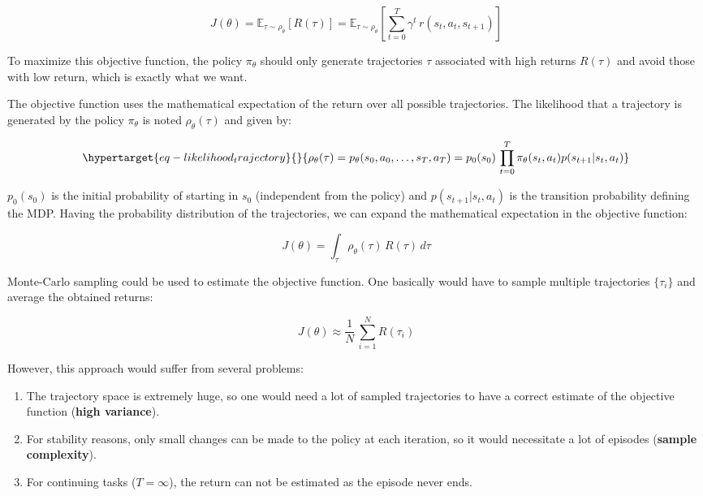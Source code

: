 \documentclass[
  letterpaper,
  DIV=11,
  numbers=noendperiod]{scrreprt}
\providecommand{\tightlist}{%
  \setlength{\itemsep}{0pt}\setlength{\parskip}{0pt}}\usepackage{longtable,booktabs,array}
\begin{document}
\[
    J(\theta) = \mathbb{E}_{\tau \sim \rho_\theta}[R(\tau)] = \mathbb{E}_{\tau \sim \rho_\theta}[\sum_{t=0}^T \gamma^t \, r(s_t, a_t, s_{t+1}) ]
\]

To maximize this objective function, the policy \(\pi_\theta\) should
only generate trajectories \(\tau\) associated with high returns
\(R(\tau)\) and avoid those with low return, which is exactly what we
want.

The objective function uses the mathematical expectation of the return
over all possible trajectories. The likelihood that a trajectory is
generated by the policy \(\pi_\theta\) is noted \(\rho_\theta(\tau)\)
and given by:

\begin{equation}\protect\hypertarget{eq-likelihood_trajectory}{}{
    \rho_\theta(\tau) = p_\theta(s_0, a_0, \ldots, s_T, a_T) = p_0 (s_0) \, \prod_{t=0}^T \pi_\theta(s_t, a_t) p(s_{t+1} | s_t, a_t)
}\label{eq-likelihood_trajectory}\end{equation}

\(p_0 (s_0)\) is the initial probability of starting in \(s_0\)
(independent from the policy) and \(p(s_{t+1} | s_t, a_t)\) is the
transition probability defining the MDP. Having the probability
distribution of the trajectories, we can expand the mathematical
expectation in the objective function:

\[
    J(\theta) = \int_\tau \rho_\theta (\tau) \, R(\tau) \, d\tau
\]

Monte-Carlo sampling could be used to estimate the objective function.
One basically would have to sample multiple trajectories \(\{\tau_i\}\)
and average the obtained returns:

\[
    J(\theta) \approx \frac{1}{N} \, \sum_{i=1}^N  R(\tau_i)
\]

However, this approach would suffer from several problems:

\begin{enumerate}
\def\labelenumi{\arabic{enumi}.}
\tightlist
\item
  The trajectory space is extremely huge, so one would need a lot of
  sampled trajectories to have a correct estimate of the objective
  function (\textbf{high variance}).
\item
  For stability reasons, only small changes can be made to the policy at
  each iteration, so it would necessitate a lot of episodes
  (\textbf{sample complexity}).
\item
  For continuing tasks (\(T = \infty\)), the return can not be estimated
  as the episode never ends.
\end{enumerate}
\end{document}
